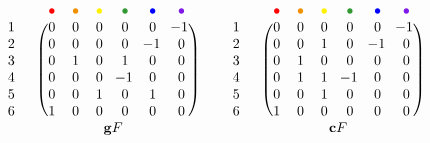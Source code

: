 \(
\begin{blockarray}{cccccccc}
	& & {\color{red} \bullet} & {\color{orange} \bullet} & {\color{yellow} \bullet} & {\color{green} \bullet} & {\color{blue} \bullet} & {\color{violet} \bullet} \\
	\begin{block}{cc(cccccc)}
	1 & & 0 & 0 & 0 & 0 & 0 & \!\!-1\\
	2 & & 0 & 0 & 0 & 0 & \!\!-1\!\! & 0 \\
	3 & & 0 & 1 & 0 & 1 & 0 & 0 \\
	4 & & 0 & 0 & 0 & \!\!-1\!\! & 0 & 0 \\
	5 & & 0 & 0 & 1 & 0 & 1 & 0 \\
	6 & & 1 & 0 & 0 & 0 & 0 & 0 \\
	\end{block}
	& & & & \multicolumn{2}{c}{$\gvectors{F}$} & &
\end{blockarray}
%
\qquad
%
\begin{blockarray}{cccccccc}
	& & {\color{red} \bullet} & {\color{orange} \bullet} & {\color{yellow} \bullet} & {\color{green} \bullet} & {\color{blue} \bullet} & {\color{violet} \bullet} \\
	\begin{block}{cc(cccccc)}
	1 & & 0 & 0 & 0 & 0 & 0 & \!\!-1 \\
	2 & & 0 & 0 & 1 & 0 & \!\!-1\!\! & 0 \\
	3 & & 0 & 1 & 0 & 0 & 0 & 0 \\
	4 & & 0 & 1 & 1 & \!\!-1\!\! & 0 & 0 \\
	5 & & 0 & 0 & 1 & 0 & 0 & 0 \\
	6 & & 1 & 0 & 0 & 0 & 0 & 0 \\
	\end{block}
	& & & & \multicolumn{2}{c}{$\cvectors{F}$} & &
\end{blockarray}
\)